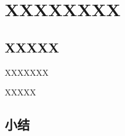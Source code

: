 \newpage
{\centering\section{XXXXXXXX}}


\subsection{XXXXX}

\begin{myCor}
\label{cor}
XXXXXXX
\end{myCor}


 
 


\begin{myExam}
\label{Example}
XXXXX
\end{myExam}






\subsection{小结}

 